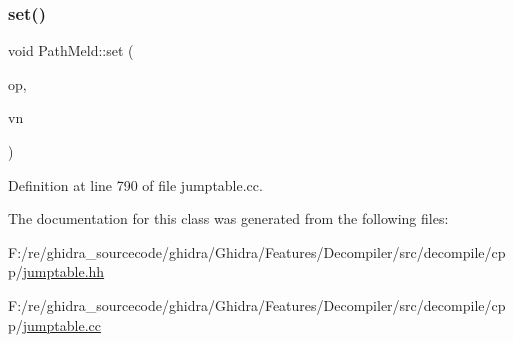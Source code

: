 \mbox{\label{class_path_meld_ac1c67e77757d48ed47dcc35758fb97af}} 
\subsubsection{\texorpdfstring{set()}{set()}\hspace{0.1cm}{\footnotesize\ttfamily [3/3]}}
{\footnotesize\ttfamily void Path\+Meld\+::set (\begin{DoxyParamCaption}\item[{\mbox{\hyperlink{class_pcode_op}{Pcode\+Op}} $\ast$}]{op,  }\item[{\mbox{\hyperlink{class_varnode}{Varnode}} $\ast$}]{vn }\end{DoxyParamCaption})}



Definition at line 790 of file jumptable.\+cc.



The documentation for this class was generated from the following files\+:\begin{DoxyCompactItemize}
\item 
F\+:/re/ghidra\+\_\+sourcecode/ghidra/\+Ghidra/\+Features/\+Decompiler/src/decompile/cpp/\mbox{\hyperlink{jumptable_8hh}{jumptable.\+hh}}\item 
F\+:/re/ghidra\+\_\+sourcecode/ghidra/\+Ghidra/\+Features/\+Decompiler/src/decompile/cpp/\mbox{\hyperlink{jumptable_8cc}{jumptable.\+cc}}\end{DoxyCompactItemize}
